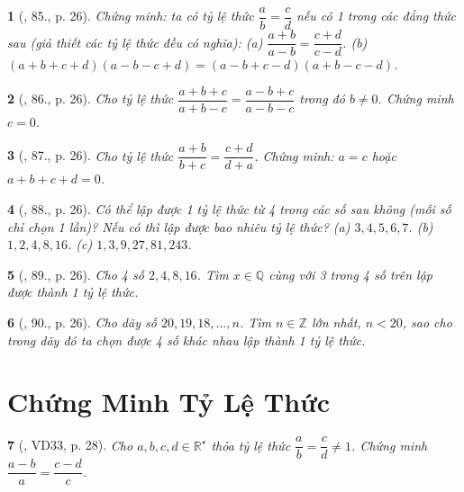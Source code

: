 \documentclass{article}
\newtheorem{baitoan}{}
\begin{document}
\begin{baitoan}[\cite{Binh_Toan_7_tap_1}, 85., p. 26]
	Chứng minh: ta có tỷ lệ thức $\dfrac{a}{b} = \dfrac{c}{d}$ nếu có 1 trong các đẳng thức sau (giả thiết các tỷ lệ thức đều có nghĩa): (a) $\dfrac{a + b}{a - b} = \dfrac{c + d}{c - d}$. (b) $(a + b + c + d)(a - b - c + d) = (a - b + c - d)(a + b - c - d)$.	
\end{baitoan}

\begin{baitoan}[\cite{Binh_Toan_7_tap_1}, 86., p. 26]
	Cho tỷ lệ thức $\dfrac{a + b + c}{a + b - c} = \dfrac{a - b + c}{a - b - c}$ trong đó $b\ne 0$. Chứng minh $c = 0$.
\end{baitoan}

\begin{baitoan}[\cite{Binh_Toan_7_tap_1}, 87., p. 26]
	Cho tỷ lệ thức $\dfrac{a + b}{b + c} = \dfrac{c + d}{d + a}$. Chứng minh: $a = c$ hoặc $a + b + c + d = 0$.
\end{baitoan}

\begin{baitoan}[\cite{Binh_Toan_7_tap_1}, 88., p. 26]
	Có thể lập được 1 tỷ lệ thức từ 4 trong các số sau không (mỗi số chỉ chọn 1 lần)? Nếu có thì lập được bao nhiêu tỷ lệ thức? (a) $3,4,5,6,7$. (b) $1,2,4,8,16$. (c) $1,3,9,27,81,243$.	
\end{baitoan}

\begin{baitoan}[\cite{Binh_Toan_7_tap_1}, 89., p. 26]
	Cho 4 số $2,4,8,16$. Tìm $x\in\mathbb{Q}$ cùng với 3 trong 4 số trên lập được thành 1 tỷ lệ thức.
\end{baitoan}

\begin{baitoan}[\cite{Binh_Toan_7_tap_1}, 90., p. 26]
	Cho dãy số $20,19,18,\ldots,n$. Tìm $n\in\mathbb{Z}$ lớn nhất, $n < 20$, sao cho trong dãy đó ta chọn được 4 số khác nhau lập thành 1 tỷ lệ thức.
\end{baitoan}


\section{Chứng Minh Tỷ Lệ Thức}

\begin{baitoan}[\cite{Tuyen_Toan_7}, VD33, p. 28]
	Cho $a,b,c,d\in\mathbb{R}^\star$ thỏa tỷ lệ thức $\dfrac{a}{b} = \dfrac{c}{d}\ne 1$. Chứng minh $\dfrac{a - b}{a} = \dfrac{c - d}{c}$.
\end{baitoan}
\end{document}
